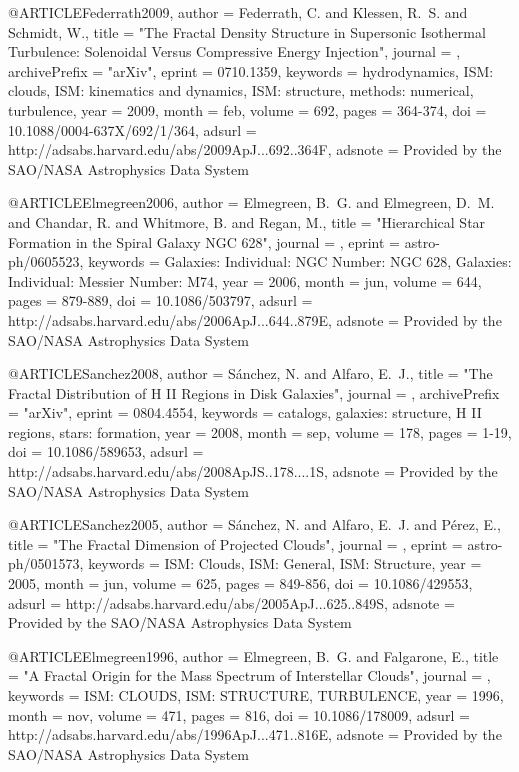 \documentclass[useAMS,usenatbib]{mnras}
\begin{document}
{{{{{{{{{{{{{{{@ARTICLE{Federrath2009,
   author = {{Federrath}, C. and {Klessen}, R.~S. and {Schmidt}, W.},
    title = "{The Fractal Density Structure in Supersonic Isothermal Turbulence: Solenoidal Versus Compressive Energy Injection}",
  journal = {\apj},
archivePrefix = "arXiv",
   eprint = {0710.1359},
 keywords = {hydrodynamics, ISM: clouds, ISM: kinematics and dynamics, ISM: structure, methods: numerical, turbulence},
     year = 2009,
    month = feb,
   volume = 692,
    pages = {364-374},
      doi = {10.1088/0004-637X/692/1/364},
   adsurl = {http://adsabs.harvard.edu/abs/2009ApJ...692..364F},
  adsnote = {Provided by the SAO/NASA Astrophysics Data System}
}

@ARTICLE{Elmegreen2006,
   author = {{Elmegreen}, B.~G. and {Elmegreen}, D.~M. and {Chandar}, R. and 
	{Whitmore}, B. and {Regan}, M.},
    title = "{Hierarchical Star Formation in the Spiral Galaxy NGC 628}",
  journal = {\apj},
   eprint = {astro-ph/0605523},
 keywords = {Galaxies: Individual: NGC Number: NGC 628, Galaxies: Individual: Messier Number: M74},
     year = 2006,
    month = jun,
   volume = 644,
    pages = {879-889},
      doi = {10.1086/503797},
   adsurl = {http://adsabs.harvard.edu/abs/2006ApJ...644..879E},
  adsnote = {Provided by the SAO/NASA Astrophysics Data System}
}

@ARTICLE{Sanchez2008,
   author = {{S{\'a}nchez}, N. and {Alfaro}, E.~J.},
    title = "{The Fractal Distribution of H II Regions in Disk Galaxies}",
  journal = {\apjs},
archivePrefix = "arXiv",
   eprint = {0804.4554},
 keywords = {catalogs, galaxies: structure, H II regions, stars: formation},
     year = 2008,
    month = sep,
   volume = 178,
    pages = {1-19},
      doi = {10.1086/589653},
   adsurl = {http://adsabs.harvard.edu/abs/2008ApJS..178....1S},
  adsnote = {Provided by the SAO/NASA Astrophysics Data System}
}

@ARTICLE{Sanchez2005,
   author = {{S{\'a}nchez}, N. and {Alfaro}, E.~J. and {P{\'e}rez}, E.},
    title = "{The Fractal Dimension of Projected Clouds}",
  journal = {\apj},
   eprint = {astro-ph/0501573},
 keywords = {ISM: Clouds, ISM: General, ISM: Structure},
     year = 2005,
    month = jun,
   volume = 625,
    pages = {849-856},
      doi = {10.1086/429553},
   adsurl = {http://adsabs.harvard.edu/abs/2005ApJ...625..849S},
  adsnote = {Provided by the SAO/NASA Astrophysics Data System}
}

@ARTICLE{Elmegreen1996,
   author = {{Elmegreen}, B.~G. and {Falgarone}, E.},
    title = "{A Fractal Origin for the Mass Spectrum of Interstellar Clouds}",
  journal = {\apj},
 keywords = {ISM: CLOUDS, ISM: STRUCTURE, TURBULENCE},
     year = 1996,
    month = nov,
   volume = 471,
    pages = {816},
      doi = {10.1086/178009},
   adsurl = {http://adsabs.harvard.edu/abs/1996ApJ...471..816E},
  adsnote = {Provided by the SAO/NASA Astrophysics Data System}
}

}}}}}}}}}}}}}}}
\end{document}
